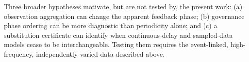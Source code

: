 Three broader hypotheses motivate, but are not tested by, the present work: (a) observation aggregation can change the apparent feedback phase; (b) governance phase ordering can be more diagnostic than periodicity alone; and (c) a substitution certificate can identify when continuous-delay and sampled-data models cease to be interchangeable. Testing them requires the event-linked, high-frequency, independently varied data described above.

